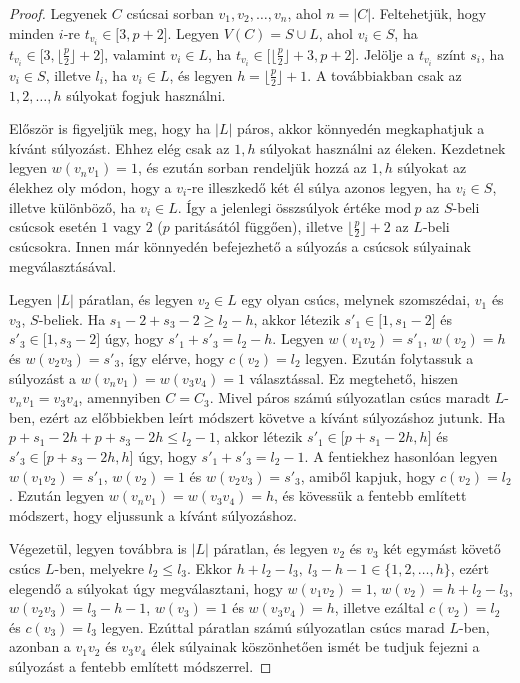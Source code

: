 \documentclass[12pt, a4paper]{report}
\theoremstyle{remark}
\theoremstyle{definition}
\begin{document}
\begin{proof}
Legyenek $C$ csúcsai sorban $v_1, v_2, \ldots, v_n$, ahol $n = |C|$. Feltehetjük, hogy minden $i$-re $t_{v_i} \in \lbrack 3, p + 2 \rbrack$. Legyen $V(C) = S \cup L$, ahol $v_i \in S$, ha $t_{v_i} \in \lbrack 3, \lfloor \frac{p}{2} \rfloor + 2 \rbrack$, valamint $v_i \in L$, ha $t_{v_i} \in \lbrack \lfloor \frac{p}{2} \rfloor + 3, p + 2 \rbrack$. Jelölje a $t_{v_i}$ színt $s_i$, ha $v_i \in S$, illetve $l_i$, ha $v_i \in L$, és legyen $h = \lfloor \frac{p}{2} \rfloor + 1$. A továbbiakban csak az $1, 2, \ldots, h$ súlyokat fogjuk használni. 

Először is figyeljük meg, hogy ha $|L|$ páros, akkor könnyedén megkaphatjuk a kívánt súlyozást. Ehhez elég csak az $1, h$ súlyokat használni az éleken. Kezdetnek legyen $w(v_n v_1) = 1$, és ezután sorban rendeljük hozzá az $1, h$ súlyokat az élekhez oly módon, hogy a $v_i$-re illeszkedő két él súlya azonos legyen, ha $v_i \in S$, illetve különböző, ha $v_i \in L$. Így a jelenlegi összsúlyok értéke $\mathrm{mod}\ p$ az $S$-beli csúcsok esetén $1$ vagy $2$ ($p$ paritásától függően), illetve $\lfloor \frac{p}{2} \rfloor + 2$ az $L$-beli csúcsokra. Innen már könnyedén befejezhető a súlyozás a csúcsok súlyainak megválasztásával.

Legyen $|L|$ páratlan, és legyen $v_2 \in L$ egy olyan csúcs, melynek szomszédai, $v_1$ és $v_3$, $S$-beliek. Ha $s_1 - 2 + s_3 - 2 \geq l_2 - h$, akkor létezik $s'_1 \in \lbrack 1, s_1 - 2 \rbrack$ és $s'_3 \in \lbrack 1, s_3 - 2 \rbrack$ úgy, hogy $s'_1 + s'_3 = l_2 - h$. Legyen $w(v_1 v_2) = s'_1$, $w(v_2) = h$ és $w(v_2 v_3) = s'_3$, így elérve, hogy $c(v_2) = l_2$ legyen. Ezután folytassuk a súlyozást a $w(v_n v_1) = w(v_3 v_4) = 1$ választással. Ez megtehető, hiszen $v_n v_1 = v_3 v_4$, amennyiben $C = C_3$. Mivel páros számú súlyozatlan csúcs maradt $L$-ben, ezért az előbbiekben leírt módszert követve a kívánt súlyozáshoz jutunk. Ha $p + s_1 - 2h + p + s_3 - 2h \leq l_2 - 1$, akkor létezik $s'_1 \in \lbrack p + s_1 - 2h, h \rbrack$ és $s'_3 \in \lbrack p + s_3 - 2h, h \rbrack$ úgy, hogy $s'_1 + s'_3 = l_2 - 1$. A fentiekhez hasonlóan legyen $w(v_1 v_2)= s'_1$, $w(v_2) = 1$ és $w(v_2 v_3) = s'_3$, amiből kapjuk, hogy $c(v_2) = l_2$. Ezután legyen $w(v_n v_1) = w(v_3 v_4) = h$, és kövessük a fentebb említett módszert, hogy eljussunk a kívánt súlyozáshoz.

Végezetül, legyen továbbra is $|L|$ páratlan, és legyen $v_2$ és $v_3$ két egymást követő csúcs $L$-ben, melyekre $l_2 \leq l_3$. Ekkor $h + l_2 - l_3,\ l_3 - h - 1 \in \lbrace 1, 2, \ldots, h \rbrace$, ezért elegendő a súlyokat úgy megválasztani, hogy $w(v_1 v_2) = 1$, $w(v_2) = h + l_2 - l_3$, $w(v_2 v_3) = l_3 - h - 1$, $w(v_3) = 1$ és $w(v_3 v_4) = h$, illetve ezáltal $c(v_2) = l_2$ és $c(v_3) = l_3$ legyen. Ezúttal páratlan számú súlyozatlan csúcs marad $L$-ben, azonban a $v_1 v_2$ és $v_3 v_4$ élek súlyainak köszönhetően ismét be tudjuk fejezni a súlyozást a fentebb említett módszerrel.
\end{proof}
\end{document}
